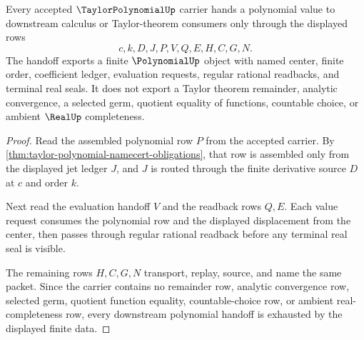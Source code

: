\begin{theorem}
\label{thm:taylor-polynomial-polynomial-handoff}
Every accepted $\TaylorPolynomialUp$ carrier hands a polynomial value to downstream calculus or Taylor-theorem consumers only through the displayed rows
$$
c,k,D,J,P,V,Q,E,H,C,G,N .
$$
The handoff exports a finite $\PolynomialUp$ object with named center, finite order, coefficient ledger, evaluation requests, regular rational readbacks, and terminal real seals. It does not export a Taylor theorem remainder, analytic convergence, a selected germ, quotient equality of functions, countable choice, or ambient $\RealUp$ completeness.
\end{theorem}
\begin{proof}
Read the assembled polynomial row $P$ from the accepted carrier. By \autoref{thm:taylor-polynomial-namecert-obligations}, that row is assembled only from the displayed jet ledger $J$, and $J$ is routed through the finite derivative source $D$ at $c$ and order $k$.

Next read the evaluation handoff $V$ and the readback rows $Q,E$. Each value request consumes the polynomial row and the displayed displacement from the center, then passes through regular rational readback before any terminal real seal is visible.

The remaining rows $H,C,G,N$ transport, replay, source, and name the same packet. Since the carrier contains no remainder row, analytic convergence row, selected germ, quotient function equality, countable-choice row, or ambient real-completeness row, every downstream polynomial handoff is exhausted by the displayed finite data.
\end{proof}



